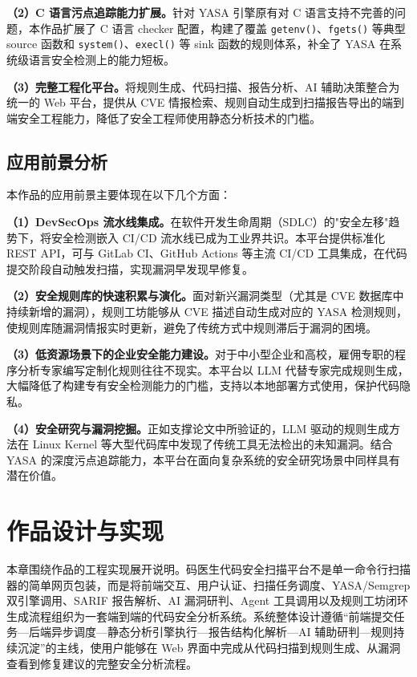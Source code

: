 \documentclass[a4paper,12pt,UTF8]{ctexart}
\numberwithin{figure}{section}
\numberwithin{table}{section}
\numberwithin{equation}{section}
\begin{document}
{\textbf{（2）C 语言污点追踪能力扩展。}针对 YASA 引擎原有对 C 语言支持不完善的问题，本作品扩展了 C 语言 checker 配置，构建了覆盖 \texttt{getenv()}、\texttt{fgets()} 等典型 source 函数和 \texttt{system()}、\texttt{execl()} 等 sink 函数的规则体系，补全了 YASA 在系统级语言安全检测上的能力短板。

\textbf{（3）完整工程化平台。}将规则生成、代码扫描、报告分析、AI 辅助决策整合为统一的 Web 平台，提供从 CVE 情报检索、规则自动生成到扫描报告导出的端到端安全工程能力，降低了安全工程师使用静态分析技术的门槛。

\subsection{应用前景分析}

{\songti
本作品的应用前景主要体现在以下几个方面：

\textbf{（1）DevSecOps 流水线集成。}在软件开发生命周期（SDLC）的"安全左移"趋势下，将安全检测嵌入 CI/CD 流水线已成为工业界共识。本平台提供标准化 REST API，可与 GitLab CI、GitHub Actions 等主流 CI/CD 工具集成，在代码提交阶段自动触发扫描，实现漏洞早发现早修复。

\textbf{（2）安全规则库的快速积累与演化。}面对新兴漏洞类型（尤其是 CVE 数据库中持续新增的漏洞），规则工坊能够从 CVE 描述自动生成对应的 YASA 检测规则，使规则库随漏洞情报实时更新，避免了传统方式中规则滞后于漏洞的困境。

\textbf{（3）低资源场景下的企业安全能力建设。}对于中小型企业和高校，雇佣专职的程序分析专家编写定制化规则往往不现实。本平台以 LLM 代替专家完成规则生成，大幅降低了构建专有安全检测能力的门槛，支持以本地部署方式使用，保护代码隐私。

\textbf{（4）安全研究与漏洞挖掘。}正如支撑论文中所验证的，LLM 驱动的规则生成方法在 Linux Kernel 等大型代码库中发现了传统工具无法检出的未知漏洞\cite{hou2025}。结合 YASA 的深度污点追踪能力，本平台在面向复杂系统的安全研究场景中同样具有潜在价值。
\par}
}

\newpage

\section{作品设计与实现}

{\songti
本章围绕作品的工程实现展开说明。码医生代码安全扫描平台不是单一命令行扫描器的简单网页包装，而是将前端交互、用户认证、扫描任务调度、YASA/Semgrep 双引擎调用、SARIF 报告解析、AI 漏洞研判、Agent 工具调用以及规则工坊闭环生成流程组织为一套端到端的代码安全分析系统。系统整体设计遵循“前端提交任务—后端异步调度—静态分析引擎执行—报告结构化解析—AI 辅助研判—规则持续沉淀”的主线，使用户能够在 Web 界面中完成从代码扫描到规则生成、从漏洞查看到修复建议的完整安全分析流程。
\par}
\end{document}
